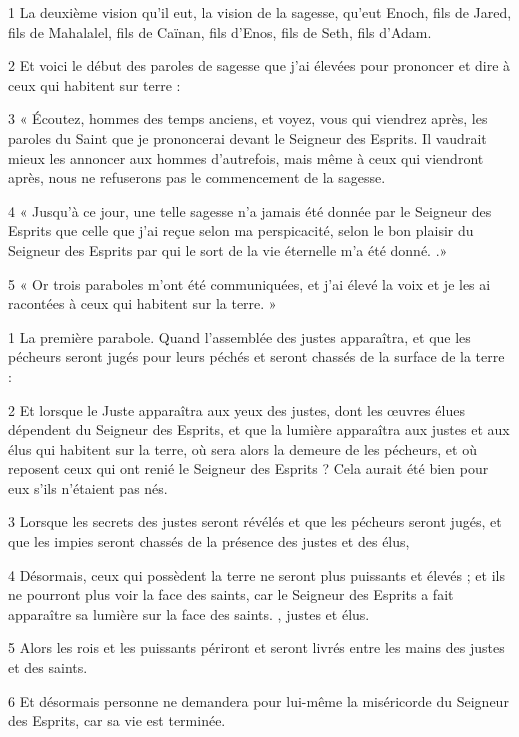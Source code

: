 \par 1 La deuxième vision qu'il eut, la vision de la sagesse, qu'eut Enoch, fils de Jared, fils de Mahalalel, fils de Caïnan, fils d'Enos, fils de Seth, fils d'Adam.
\par 2 Et voici le début des paroles de sagesse que j'ai élevées pour prononcer et dire à ceux qui habitent sur terre :
\par 3 « Écoutez, hommes des temps anciens, et voyez, vous qui viendrez après, les paroles du Saint que je prononcerai devant le Seigneur des Esprits. Il vaudrait mieux les annoncer aux hommes d'autrefois, mais même à ceux qui viendront après, nous ne refuserons pas le commencement de la sagesse.
\par 4 « Jusqu'à ce jour, une telle sagesse n'a jamais été donnée par le Seigneur des Esprits que celle que j'ai reçue selon ma perspicacité, selon le bon plaisir du Seigneur des Esprits par qui le sort de la vie éternelle m'a été donné. .»
\par 5 « Or trois paraboles m'ont été communiquées, et j'ai élevé la voix et je les ai racontées à ceux qui habitent sur la terre. »

\par 1 La première parabole. Quand l’assemblée des justes apparaîtra, et que les pécheurs seront jugés pour leurs péchés et seront chassés de la surface de la terre :
\par 2 Et lorsque le Juste apparaîtra aux yeux des justes, dont les œuvres élues dépendent du Seigneur des Esprits, et que la lumière apparaîtra aux justes et aux élus qui habitent sur la terre, où sera alors la demeure de les pécheurs, et où reposent ceux qui ont renié le Seigneur des Esprits ? Cela aurait été bien pour eux s'ils n'étaient pas nés.
\par 3 Lorsque les secrets des justes seront révélés et que les pécheurs seront jugés, et que les impies seront chassés de la présence des justes et des élus,
\par 4 Désormais, ceux qui possèdent la terre ne seront plus puissants et élevés ; et ils ne pourront plus voir la face des saints, car le Seigneur des Esprits a fait apparaître sa lumière sur la face des saints. , justes et élus.
\par 5 Alors les rois et les puissants périront et seront livrés entre les mains des justes et des saints.
\par 6 Et désormais personne ne demandera pour lui-même la miséricorde du Seigneur des Esprits, car sa vie est terminée.


